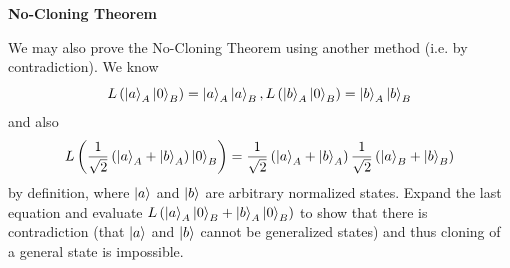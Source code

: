 \documentclass[a4paper, 10pt]{article}
\begin{document}
\subject
{}

\begin{problem}
\textbf{No-Cloning Theorem}
\par We may also prove the No-Cloning Theorem using another method (i.e. by contradiction).
We know
\[
	L \left(\ket{a}_A \ket{0}_B\right) = \ket{a}_A \ket{a}_B,
	L \left(\ket{b}_A \ket{0}_B\right) = \ket{b}_A \ket{b}_B
\]
and also
\[
	L \left(\frac{1}{\sqrt{2}} \left(\ket{a}_A + \ket{b}_A\right) \ket{0}_B\right) = \frac{1}{\sqrt{2}} \left(\ket{a}_A + \ket{b}_A\right) \frac{1}{\sqrt{2}} \left(\ket{a}_B + \ket{b}_B\right)
\]
by definition, where \( \ket{a} \) and \( \ket{b} \) are arbitrary normalized states.
Expand the last equation and evaluate \( L \left(\ket{a}_A \ket{0}_B + \ket{b}_A \ket{0}_B\right) \)
to show that there is contradiction (that \( \ket{a} \) and \( \ket{b} \) cannot be generalized states)
and thus cloning of a general state is impossible.
\end{problem}
\end{document}
